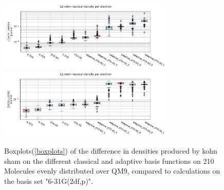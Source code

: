 \begin{figure}
    \centering
    \includegraphics[width=0.75\textwidth]{chapters/results/results_images/adaptive_basis_functions/L2-norm_residual_density_per_electron_adaptive_basis_sets}
    \includegraphics[width=0.75\textwidth]{chapters/results/results_images/adaptive_basis_functions/L1-norm_residual_density_per_electron_adaptive_basis_sets}
    \caption{Boxplots(\ref{boxplots}) of the difference in densities produced by kohn sham on the different classical and adaptive basis functions on 210 Molecules evenly distributed over QM9, compared to calculations on the basis set "6-31G(2df,p)".}
    \label{fig:residual_density_adaptive_basis_sets}
\end{figure}

